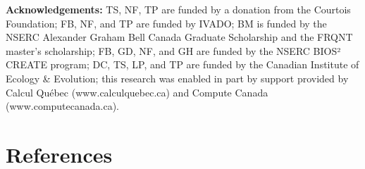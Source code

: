 \documentclass[11pt]{article}
\begin{document}
\textbf{Acknowledgements:} TS, NF, TP are funded by a donation from the
Courtois Foundation; FB, NF, and TP are funded by IVADO; BM is funded by
the NSERC Alexander Graham Bell Canada Graduate Scholarship and the
FRQNT master's scholarship; FB, GD, NF, and GH are funded by the NSERC
BIOS² CREATE program; DC, TS, LP, and TP are funded by the Canadian
Institute of Ecology \& Evolution; this research was enabled in part by
support provided by Calcul Québec (www.calculquebec.ca) and Compute
Canada (www.computecanada.ca).

\hypertarget{references}{%
\section*{References}\label{references}}
\end{document}
